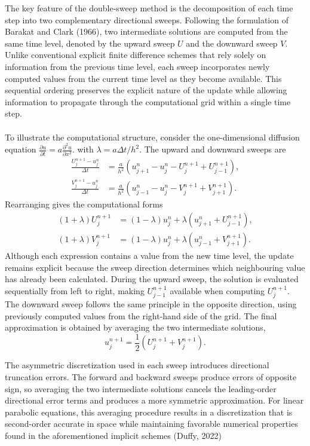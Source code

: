 \documentclass[12pt,a4paper]{article}
\begin{document}
The key feature of the double-sweep method is the decomposition of each time step into two complementary directional sweeps. Following the formulation of Barakat and Clark (1966), two intermediate solutions are computed from the same time level, denoted by the upward sweep $U$ and the downward sweep $V$. Unlike conventional explicit finite difference schemes that rely solely on information from the previous time level, each sweep incorporates newly computed values from the current time level as they become available. This sequential ordering preserves the explicit nature of the update while allowing information to propagate through the computational grid within a single time step.\\\\
To illustrate the computational structure, consider the one-dimensional diffusion equation $\frac{\partial u}{\partial t}
=
a\frac{\partial^2u}{\partial x^2}.$  with $\lambda=a\Delta t/h^2$. The upward and downward sweeps are
\begin{align}
\frac{U_j^{n+1}-u_j^n}{\Delta t}&=\frac{a}{h^2}\left(u_{j+1}^{n}-u_j^{n}-U_j^{n+1}+U_{j-1}^{n+1}\right),\label{eq:up1d}\\
\frac{V_j^{n+1}-u_j^n}{\Delta t}&=\frac{a}{h^2}\left(u_{j-1}^{n}-u_j^{n}-V_j^{n+1}+V_{j+1}^{n+1}\right).\label{eq:down1d}
\end{align}
Rearranging gives the computational forms
\begin{align}
(1+\lambda)U_j^{n+1}&=(1-\lambda)u_j^n+\lambda\left(u_{j+1}^{n}+U_{j-1}^{n+1}\right),\\
(1+\lambda)V_j^{n+1}&=(1-\lambda)u_j^n+\lambda\left(u_{j-1}^{n}+V_{j+1}^{n+1}\right).
\end{align}
Although each expression contains a value from the new time level, the update remains explicit because the sweep direction determines which neighbouring value has already been calculated. During the upward sweep, the solution is evaluated sequentially from left to right, making $U_{j-1}^{n+1}$ available when computing $U_j^{n+1}$. The downward sweep follows the same principle in the opposite direction, using previously computed values from the right-hand side of the grid. The final approximation is obtained by averaging the two intermediate solutions,
\begin{equation}\label{eq:avg}
u_j^{n+1}=\frac{1}{2}\left(U_j^{n+1}+V_j^{n+1}\right).
\end{equation}

The asymmetric discretization used in each sweep introduces directional truncation errors. The forward and backward sweeps produce errors of opposite sign, so averaging the two intermediate solutions cancels the leading-order directional error terms and produces a more symmetric approximation. For linear parabolic equations, this averaging procedure results in a discretization that is second-order accurate in space while maintaining favorable numerical properties found in the aforementioned implicit schemes (Duffy, 2022)\\\\
\end{document}
